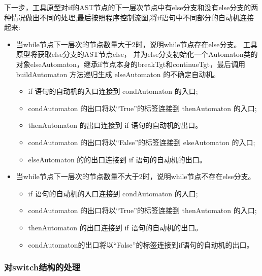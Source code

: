 下一步，工具原型对if的AST节点的下一层次节点中有else分支和没有else分支的两种情况做出不同的处理,最后按照程序控制流图,将if语句中不同部分的自动机连接起来:
\begin{itemize}
    \item 当while节点下一层次的节点数量大于2时，说明while节点存在else分支。
    工具原型将获取else分支的AST节点else，
    并为else分支初始化一个Automaton类的对象elseAutomaton，继承if节点本身的breakTgt和continueTgt，最后调用 buildAutomaton 方法递归生成 elseAutomaton 的不确定自动机。
    \begin{itemize}
        \item if 语句的自动机的入口连接到 condAutomaton 的入口;
        \item condAutomaton 的出口将以“True”的标签连接到 thenAutomaton 的入口;
        \item thenAutomaton 的出口连接到 if 语句的自动机的出口。
        \item condAutomaton 的出口将以“False”的标签连接到 elseAutomaton 的入口;
        \item elseAutomaton 的的出口连接到 if 语句的自动机的出口。
    \end{itemize}
    \item 当while节点下一层次的节点数量不大于2时，说明while节点不存在else分支。
        \begin{itemize}
        \item if 语句的自动机的入口连接到 condAutomaton 的入口;
        \item condAutomaton 的出口将以“True”的标签连接到 thenAutomaton 的入口;
        \item thenAutomaton 的出口连接到 if 语句的自动机的出口。
        \item condAutomaton的出口将以“False”的标签连接到if语句的自动机的出口。
    \end{itemize}
\end{itemize}

\subsubsection{对switch结构的处理}


